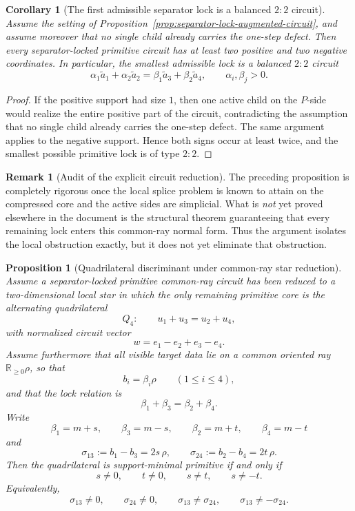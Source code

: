 \documentclass[11pt]{article}
\newtheorem{proposition}[theorem]{Proposition}
\newtheorem{corollary}[theorem]{Corollary}
\theoremstyle{definition}
\newtheorem{remark}[theorem]{Remark}
\newcommand{\R}{\mathbb{R}}
\newcommand{\1}{\mathbf{1}}
\begin{document}
\begin{corollary}[The first admissible separator lock is a balanced $2{:}2$ circuit]\label{cor:separator-lock-22}
Assume the setting of Proposition~\ref{prop:separator-lock-augmented-circuit}, and assume moreover that no single child already carries the one-step defect. Then every separator-locked primitive circuit has at least two positive and two negative coordinates. In particular, the smallest admissible lock is a balanced $2{:}2$ circuit
\[
\alpha_1\widetilde a_1+\alpha_2\widetilde a_2
=
\beta_1\widetilde a_3+\beta_2\widetilde a_4,
\qquad
\alpha_i,\beta_j>0.
\]
\end{corollary}

\begin{proof}
If the positive support had size $1$, then one active child on the $P$-side would realize the entire positive part of the circuit, contradicting the assumption that no single child already carries the one-step defect. The same argument applies to the negative support. Hence both signs occur at least twice, and the smallest possible primitive lock is of type $2{:}2$.
\end{proof}

\begin{remark}[Audit of the explicit circuit reduction]\label{rem:separator-lock-audit}
The preceding proposition is completely rigorous once the local splice problem is known to attain on the compressed core and the active sides are simplicial. What is \emph{not} yet proved elsewhere in the document is the structural theorem guaranteeing that every remaining lock enters this common-ray normal form. Thus the argument isolates the local obstruction exactly, but it does not yet eliminate that obstruction.
\end{remark}

\begin{proposition}[Quadrilateral discriminant under common-ray star reduction]\label{prop:quadrilateral-discriminant}
Assume a separator-locked primitive common-ray circuit has been reduced to a two-dimensional local star in which the only remaining primitive core is the alternating quadrilateral
\[
Q_4:\qquad u_1+u_3=u_2+u_4,
\]
with normalized circuit vector
\[
w=e_1-e_2+e_3-e_4.
\]
Assume furthermore that all visible target data lie on a common oriented ray $\R_{\ge 0}\rho$, so that
\[
b_i=\beta_i\rho
\qquad (1\le i\le 4),
\]
and that the lock relation is
\[
\beta_1+\beta_3=\beta_2+\beta_4.
\]
Write
\[
\beta_1=m+s,\qquad \beta_3=m-s,\qquad
\beta_2=m+t,\qquad \beta_4=m-t
\]
and
\[
\sigma_{13}:=b_1-b_3=2s\,\rho,
\qquad
\sigma_{24}:=b_2-b_4=2t\,\rho.
\]
Then the quadrilateral is support-minimal primitive if and only if
\[
s\neq 0,\qquad t\neq 0,\qquad s\neq t,\qquad s\neq -t.
\]
Equivalently,
\[
\sigma_{13}\neq 0,\qquad \sigma_{24}\neq 0,\qquad
\sigma_{13}\neq \sigma_{24},\qquad
\sigma_{13}\neq -\sigma_{24}.
\]
\end{proposition}
\end{document}
